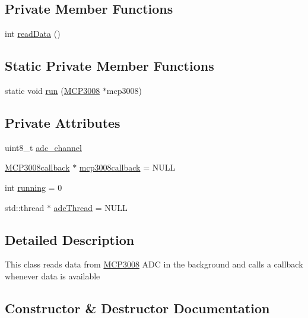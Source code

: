 \subsection*{Private Member Functions}
\begin{DoxyCompactItemize}
\item 
int \hyperlink{classMCP3008_a583bf94e4bb38d945819914c9a2321ba}{read\+Data} ()
\end{DoxyCompactItemize}
\subsection*{Static Private Member Functions}
\begin{DoxyCompactItemize}
\item 
static void \hyperlink{classMCP3008_a8e243711492e50dd4327050ffae8851d}{run} (\hyperlink{classMCP3008}{M\+C\+P3008} $\ast$mcp3008)
\end{DoxyCompactItemize}
\subsection*{Private Attributes}
\begin{DoxyCompactItemize}
\item 
uint8\+\_\+t \hyperlink{classMCP3008_a9089ac2e245b158411670c802e6ea404}{adc\+\_\+channel}
\item 
\hyperlink{classMCP3008callback}{M\+C\+P3008callback} $\ast$ \hyperlink{classMCP3008_a602724521657fd93241ba51c8dd83e74}{mcp3008callback} = N\+U\+LL
\item 
int \hyperlink{classMCP3008_a81354e1933a79bcb9f1d01c0e16566f0}{running} = 0
\item 
std\+::thread $\ast$ \hyperlink{classMCP3008_ab1318bf3a8ac2bdf31b62451d29e1c90}{adc\+Thread} = N\+U\+LL
\end{DoxyCompactItemize}


\subsection{Detailed Description}
This class reads data from \hyperlink{classMCP3008}{M\+C\+P3008} A\+DC in the background and calls a callback whenever data is available 

\subsection{Constructor \& Destructor Documentation}
\mbox{\label{classMCP3008_a31a9bfe04898e565154413cf17329859}} 

